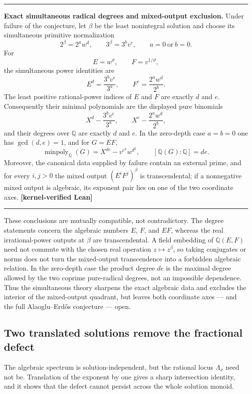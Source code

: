 \documentclass[11pt,oneside]{article}
\theoremstyle{definition}
\theoremstyle{remark}
\newcommand{\Q}{\mathbb Q}
\newcommand{\thetaq}{\vartheta}
\newcommand{\statuslean}{\textcolor{leanblue}{\textbf{[kernel-verified Lean]}}}
\newenvironment{resultbox}
{\begin{center}\begin{minipage}{0.94\textwidth}\hrule\vspace{0.45em}}
{\vspace{0.35em}\hrule\end{minipage}\end{center}}
\begin{document}
\begin{resultbox}
\textbf{Exact simultaneous radical degrees and mixed-output exclusion.}
Under failure of the conjecture, let $\beta$ be the least nonintegral solution and choose its
simultaneous primitive normalization
\[
 2^\beta=2^a w^d,\qquad 3^\beta=3^b v^e,
 \qquad a=0\ \text{or}\ b=0.
\]
For
\[
 E=w^{\thetaq},\qquad F=v^{1/\thetaq},
\]
the simultaneous power identities are
\[
 E^d=\frac{3^b v^e}{3^a},
 \qquad
 F^e=\frac{2^a w^d}{2^b}.
\]
The least positive rational-power indices of $E$ and $F$ are exactly $d$ and $e$.
Consequently their minimal polynomials are the displayed pure binomials
\[
 X^d-\frac{3^b v^e}{3^a},
 \qquad
 X^e-\frac{2^a w^d}{2^b},
\]
and their degrees over $\Q$ are exactly $d$ and $e$.  In the zero-depth case $a=b=0$ one has
$\gcd(d,e)=1$, and for $G=EF$,
\[
 \operatorname{minpoly}_{\Q}(G)=X^{de}-v^{e^2}w^{d^2},
 \qquad [\Q(G):\Q]=de.
\]
Moreover, the canonical data supplied by failure contain an external prime, and for every
$i,j>0$ the mixed output $(E^iF^j)^\beta$ is transcendental; if a nonnegative mixed output is
algebraic, its exponent pair lies on one of the two coordinate axes.  \statuslean
\end{resultbox}

These conclusions are mutually compatible, not contradictory.  The degree statements concern
the algebraic numbers $E$, $F$, and $EF$, whereas the real irrational-power outputs at
$\beta$ are transcendental.  A field embedding of $\Q(E,F)$ need not commute with the chosen
real operation $z\mapsto z^\beta$, so taking conjugates or norms does not turn the mixed-output
transcendence into a forbidden algebraic relation.  In the zero-depth case the product degree
$de$ is the maximal degree allowed by the two coprime pure-radical degrees, not an impossible
dependence.  Thus the simultaneous theory sharpens the exact algebraic data and excludes the
interior of the mixed-output quadrant, but leaves both coordinate axes --- and the full
Alaoglu--Erd\H{o}s conjecture --- open.

\subsection{Two translated solutions remove the fractional defect}

The algebraic spectrum is solution-independent, but the rational locus $\Lambda_x$ need not
be.  Translation of the exponent by one gives a sharp intersection identity, and it shows that
the defect cannot persist across the whole solution monoid.
\end{document}
